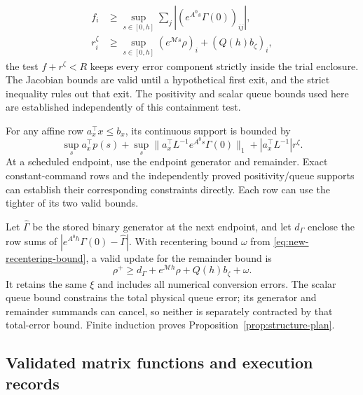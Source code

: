 \begin{equation}
 \begin{aligned}
 f_i&\ge\sup_{s\in[0,h]}\sum_j|(e^{A^0s}\Gamma(0))_{ij}|,\\
 r_i^\zeta&\ge\sup_{s\in[0,h]}(e^{\mathcal Ms}\rho)_i
                            +(Q(h)b_\zeta)_i,
 \end{aligned}
 \label{eq:structure-continuous-radii}
\end{equation}
the test $f+r^\zeta<R$ keeps every error component strictly inside the
trial enclosure. The Jacobian bounds are valid until a hypothetical first
exit, and the strict inequality rules out that exit. The positivity and
scalar queue bounds used here are established independently of this
containment test.

For any affine row $a_x^\top x\le b_x$, its continuous support is bounded by
\begin{equation}
 \sup_s a_x^\top p(s)+
 \sup_s\|a_x^\top L^{-1}e^{A^0s}\Gamma(0)\|_1+
 |a_x^\top L^{-1}|r^\zeta.
 \label{eq:structure-signed-output}
\end{equation}
At a scheduled endpoint, use the endpoint generator and remainder.
Exact constant-command rows and the independently
proved positivity/queue supports can establish their corresponding constraints
directly. Each row can use the tighter of its two valid bounds.

Let $\widehat\Gamma$ be the stored binary generator at the next endpoint,
and let $d_\Gamma$ enclose the row sums of
$|e^{A^0h}\Gamma(0)-\widehat\Gamma|$. With recentering bound $\omega$ from
\eqref{eq:new-recentering-bound}, a valid update for the remainder bound is
\begin{equation}
 \rho^+\ge d_\Gamma+e^{\mathcal Mh}\rho+Q(h)b_\zeta+\omega.
 \label{eq:structure-endpoint-update}
\end{equation}
It retains the same $\xi$ and includes all numerical conversion errors.
The scalar queue bound constrains the total physical queue error; its
generator and remainder summands can cancel, so neither is separately
contracted by that total-error bound. Finite induction proves
Proposition~\ref{prop:structure-plan}.

\subsection{Validated matrix functions and execution records}

